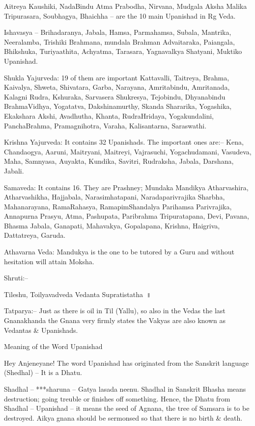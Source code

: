 \item Aitreya Kaushiki, NadaBindu Atma Prabodha, Nirvana, Mudgala Aksha Malika Tripurasara, Soubhagya, Bhaichha – are the 10 main Upanishad in Rg Veda.

 \item Ishavasya – Brihadaranya, Jabala, Hamsa, Parmahamsa, Subala, Mantrika, Neeralamba, Trishiki Brahmana, mundala Brahman Advaitaraka, Paiangala, Bhikshuka, Turiyaathita, Achyatma, Tarasara, Yagnavalkya Shatyani, Muktiko Upanishad.

Shukla Yajurveda: 19 of them are important Kattavalli, Taitreya, Brahma, Kaivalya, Shweta, Shivatara, Garba, Narayana, Amritabindu, Amritanada, Kalagni Rudra, Kshuraka, Sarvasera Shukresya, Tejobindu, Dhyanabindu BrahmaVidhya, Yogatatva, Dakshinamurthy, Skanda Shararika, Yogashika, Ekakshara Akshi, Avadhutha, Khanta, RudraHridaya, Yogakundalini, PanchaBrahma, Pramagnihotra, Varaha, Kalisantarna, Saraswathi.

Krishna Yajurveda: It contains 32 Upanishads. The important ones are:– Kena, Chandaogya, Aaruni, Maitryani, Maitreyi, Vajrasuchi, Yogachudamani, Vasudeva, Maha, Samnyasa, Auyakta, Kundika, Savitri, Rudraksha, Jabala, Darshana, Jabali.

Samaveda: It contains 16. They are Prashney; Mundaka Mandikya Atharvashira, Atharvashikha, Hajjabala, Narasimhatapani, Naradaparivrajika Sharbha, Mahanarayana, RamaRahasya, RamapimShandalya Parihamsa Parivrajika, Annapurna Prasyu, Atma, Pashupata, Paribrahma Tripuratapana, Devi, Pavana, Bhasma Jabala, Ganapati, Mahavakya, Gopalapana, Krishna, Haigriva, Dattatreya, Garuda.

Athavarna Veda: Mandukya is the one to be tutored by a Guru and without hesitation will attain Moksha.

Shruti:–

Tileshu, Toilyavadveda Vedanta Supratistatha~॥

Tatparya:– Just as there is oil in Til (Yallu), so also in the Vedas the last Gnanakhanda the Gnana very firmly states the Vakyas are also known as Vedantas \& Upanishads.

Meaning of the Word Upanishad

Hey Anjeneyane! The word Upanishad has originated from the Sanskrit language (Shedhal) – It is a Dhatu.

Shadhal – ***sharuna – Gatya lasada neenu. Shadhal in Sanskrit Bhasha means destruction; going treuble or finishes off something. Hence, the Dhatu from Shadhal – Upanishad – it means the seed of Agnana, the tree of Samsara is to be destroyed. Aikya gnana should be sermonsed so that there is no birth \& death.

